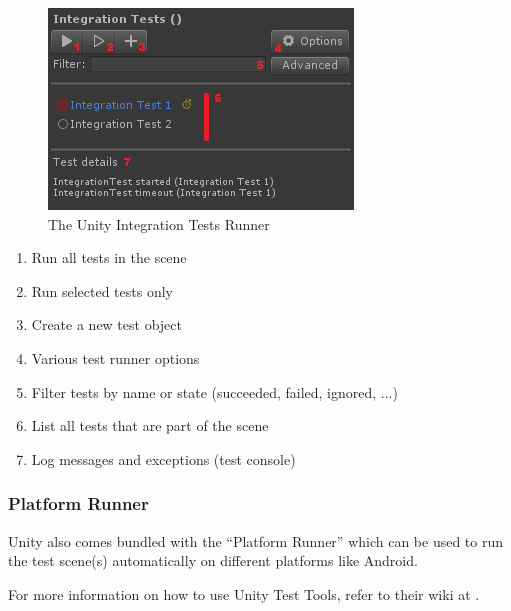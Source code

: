             \begin{figure}[hbtp]
                \centering
                \includegraphics[width=\columnwidth]{img/UnityIntegrationTestRunner.png}
                \caption{The Unity Integration Tests Runner}
                \label{fig:UnityIntTestRunner}
            \end{figure}

            \begin{enumerate}
                \setlength\itemsep{-0.4em}
                \item Run all tests in the scene
                \item Run selected tests only
                \item Create a new test object
                \item Various test runner options
                \item Filter tests by name or state (succeeded, failed, ignored, ...)
                \item List all tests that are part of the scene
                \item Log messages and exceptions (test console)
            \end{enumerate}

        \subsubsection{Platform Runner} \label{subsubsec:UnityPlatformRunner}
            Unity also comes bundled with the ``Platform Runner'' which can be used to run the test scene(s) automatically on different platforms like Android.

            For more information on how to use Unity Test Tools, refer to their wiki at \cite[]{bitbucket:unityTestToolsWiki}.

